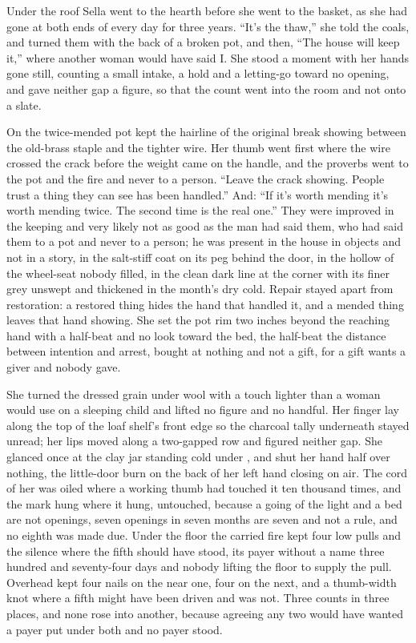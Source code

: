 \scenebreak

Under the roof Sella went to the hearth before she went to the basket, as she had gone at both ends of every day for three years. “It's the thaw,” she told the coals, and turned them with the back of a broken pot, and then, “The house will keep it,” where another woman would have said I. She stood a moment with her hands gone still, counting a small intake, a hold and a letting-go toward no opening, and gave neither gap a figure, so that the count went into the room and not onto a slate.

On  the twice-mended pot kept the hairline of the original break showing between the old-brass staple and the tighter wire. Her thumb went first where the wire crossed the crack before the weight came on the handle, and the proverbs went to the pot and the fire and never to a person. “Leave the crack showing. People trust a thing they can see has been handled.” And: “If it's worth mending it's worth mending twice. The second time is the real one.” They were improved in the keeping and very likely not as good as the man had said them, who had said them to a pot and never to a person; he was present in the house in objects and not in a story, in the salt-stiff coat on its peg behind the door, in the hollow of the wheel-seat nobody filled, in the clean dark line at the corner with its finer grey unswept and thickened in the month's dry cold. Repair stayed apart from restoration: a restored thing hides the hand that handled it, and a mended thing leaves that hand showing. She set the pot rim two inches beyond the reaching hand with a half-beat and no look toward the bed, the half-beat the distance between intention and arrest, bought at nothing and not a gift, for a gift wants a giver and nobody gave.

She turned the dressed grain under wool with a touch lighter than a woman would use on a sleeping child and lifted no figure and no handful. Her finger lay along the top of the loaf shelf's front edge so the charcoal tally underneath stayed unread; her lips moved along a two-gapped row and figured neither gap. She glanced once at the clay jar standing cold under , and shut her hand half over nothing, the little-door burn on the back of her left hand closing on air. The cord of her  was oiled where a working thumb had touched it ten thousand times, and the mark hung where it hung, untouched, because a going of the light and a bed are not openings, seven openings in seven months are seven and not a rule, and no eighth was made due. Under the floor the carried fire kept four low pulls and the silence where the fifth should have stood, its payer without a name three hundred and seventy-four days and nobody lifting the floor to supply the pull. Overhead  kept four nails on the near one, four on the next, and a thumb-width knot where a fifth might have been driven and was not. Three counts in three places, and none rose into another, because agreeing any two would have wanted a payer put under both and no payer stood.

